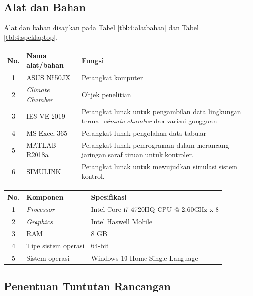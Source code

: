 \documentclass[a4paper,10pt]{article}
\makeatletter
\newenvironment{body}{\begin{multicols}{2}}{\end{multicols}}
\renewenvironment{table}
{\def\@captype{table}%
	\captionsetup{format=plain,labelsep=newline,font=footnotesize,textfont=sc,justification=centering}%
	\fontsize{8}{8}\selectfont
}
{}
\makeatother
\begin{document}
\begin{body}
		\subsection{Alat dan Bahan}
		Alat dan bahan disajikan pada Tabel \ref{tbl:4:alatbahan} dan Tabel \ref{tbl:4:speklaptop}.
		
		\begin{table}
			\centering
			\caption{Daftar alat dan bahan}
			\label{tbl:4:alatbahan}
			\fontsize{8}{8}\selectfont
			\begin{tabularx}{\linewidth}{clX}\toprule
				No. & Nama alat/bahan & Fungsi \\
				\toprule
				1 & ASUS N550JX & Perangkat komputer \\ \midrule
				2 & \textit{Climate Chamber} & Objek penelitian \\ \midrule
				3 & IES-VE 2019 & Perangkat lunak untuk pengambilan data lingkungan termal \textit{climate chamber} dan variasi gangguan \\ \midrule
				4 & MS Excel 365 & Perangkat lunak pengolahan data tabular \\ \midrule
				5 & MATLAB R2018a & Perangkat lunak pemrograman dalam merancang jaringan saraf tiruan untuk kontroler. \\ \midrule
				6 & SIMULINK & Perangkat lunak untuk mewujudkan simulasi sistem kontrol. \\ \bottomrule
			\end{tabularx}
		\end{table}
		
		\begin{table}
			\centering
			\caption{Spesifikasi laptop ASUS N550JX}
			\label{tbl:4:speklaptop}
			\fontsize{8}{8}\selectfont
			\begin{tabularx}{\linewidth}{clX}\toprule
				No. & Komponen & Spesifikasi \\ \toprule
				1 & \textit{Processor} & Intel Core i7-4720HQ CPU @ 2.60GHz x 8 \\ \midrule
				2 & \textit{Graphics} & Intel Haswell Mobile \\ \midrule
				3 & RAM & 8 GB \\ \midrule
				4 & Tipe sistem operasi & 64-bit \\ \midrule
				5 & Sistem operasi & Windows 10 Home Single Language \\ \bottomrule
			\end{tabularx}
		\end{table}
		
		\subsection{Penentuan Tuntutan Rancangan}
		

\end{body}
\end{document}
